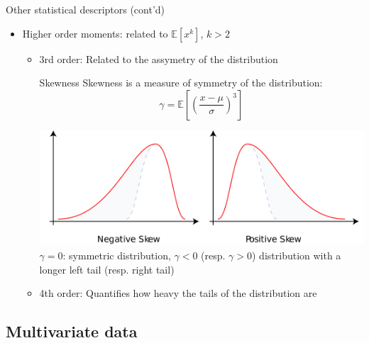 \documentclass{beamer}
\begin{document}
\begin{frame}{Other statistical descriptors (cont'd)}
\begin{itemize}
\item Higher order moments: related to $\mathbb{E}[x^{k}]$, $k > 2$\\
\begin{itemize}
\item 3rd order: Related to the assymetry of the distribution
\begin{block}{Skewness}
Skewness is a measure of symmetry of the distribution:
\begin{equation*}
\gamma = \mathbb{E}\left[ \left( \frac{x - \mu}{\sigma} \right) ^3 \right]
\end{equation*}
\begin{center}
\includegraphics[scale=0.08]{skewness.png}\\
\tiny{$\gamma = 0$: symmetric distribution, $\gamma < 0$ (resp. $\gamma > 0$) distribution with a longer left tail (resp. right tail)}
\end{center}
\end{block}
\item 4th order: Quantifies how heavy the tails of the distribution are
\end{itemize} 

\end{itemize}
\end{frame}
\subsection{Multivariate data}
\end{document}
